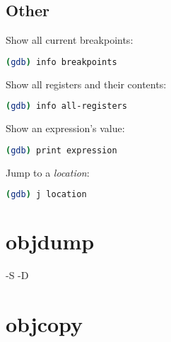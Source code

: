 \documentclass{article}
\begin{document}
	\subsection{Other}
	
	Show all current breakpoints:
	\begin{lstlisting}[language=bash]
    (gdb) info breakpoints
    \end{lstlisting}
    
    Show all registers and their contents:
    \begin{lstlisting}[language=bash]
    (gdb) info all-registers
    \end{lstlisting}
    
    Show an expression's value:
    \begin{lstlisting}[language=bash]
    (gdb) print expression
    \end{lstlisting}
    
    Jump to a \textit{location}:
    \begin{lstlisting}[language=bash]
    (gdb) j location
    \end{lstlisting}
    
    \newpage
    \section{objdump}
    
    -S -D
    
    \section{objcopy}
	
\end{document}
